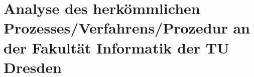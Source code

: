 \chapter{Analyse des herkömmlichen Prozesses/Verfahrens/Prozedur an der Fakultät Informatik der TU Dresden}




